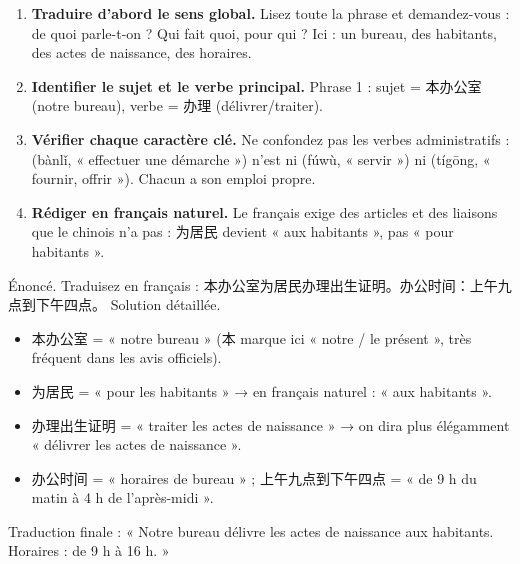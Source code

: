 \documentclass[11pt]{article}
\newcommand{\zh}[1]{\ifmmode\text{#1}\else{#1}\fi}
\begin{document}
\begin{methode}
\begin{enumerate}
\item \textbf{Traduire d'abord le sens global.} Lisez toute la phrase et demandez-vous : de quoi parle-t-on ? Qui fait quoi, pour qui ? Ici : un bureau, des habitants, des actes de naissance, des horaires.
\item \textbf{Identifier le sujet et le verbe principal.} Phrase 1 : sujet = 本办公室 (notre bureau), verbe = 办理 (délivrer/traiter).
\item \textbf{Vérifier chaque caractère clé.} Ne confondez pas les verbes administratifs : \zh{办理} (bànlǐ, « effectuer une démarche ») n'est ni \zh{服务} (fúwù, « servir ») ni \zh{提供} (tígōng, « fournir, offrir »). Chacun a son emploi propre.
\item \textbf{Rédiger en français naturel.} Le français exige des articles et des liaisons que le chinois n'a pas : 为居民 devient « aux habitants », pas « pour habitants ».
\end{enumerate}
\end{methode}

\begin{exoresolu}
Énoncé. Traduisez en français : 本办公室为居民办理出生证明。办公时间：上午九点到下午四点。
\tcblower
Solution détaillée.
\begin{itemize}
\item 本办公室 = « notre bureau » (本 marque ici « notre / le présent », très fréquent dans les avis officiels).
\item 为居民 = « pour les habitants » → en français naturel : « aux habitants ».
\item 办理出生证明 = « traiter les actes de naissance » → on dira plus élégamment « délivrer les actes de naissance ».
\item 办公时间 = « horaires de bureau » ; 上午九点到下午四点 = « de 9 h du matin à 4 h de l'après-midi ».
\end{itemize}
Traduction finale : « Notre bureau délivre les actes de naissance aux habitants. Horaires : de 9 h à 16 h. »
\end{exoresolu}
\end{document}

